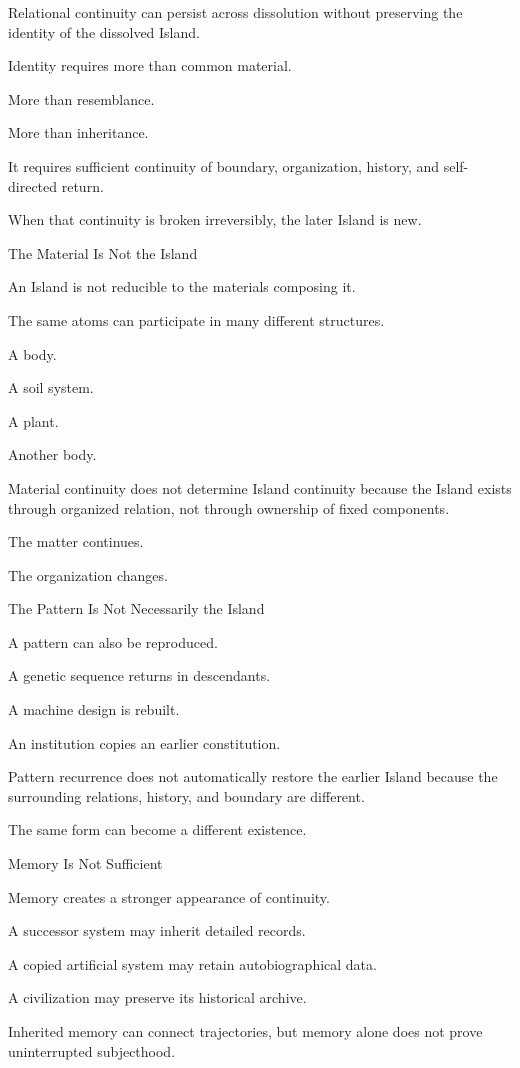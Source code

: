 Relational continuity can persist across dissolution without preserving the identity of the dissolved Island.

Identity requires more than common material.

More than resemblance.

More than inheritance.

It requires sufficient continuity of boundary, organization, history, and self-directed return.

When that continuity is broken irreversibly, the later Island is new.

The Material Is Not the Island

An Island is not reducible to the materials composing it.

The same atoms can participate in many different structures.

A body.

A soil system.

A plant.

Another body.

Material continuity does not determine Island continuity because the Island exists through organized relation, not through ownership of fixed components.

The matter continues.

The organization changes.

The Pattern Is Not Necessarily the Island

A pattern can also be reproduced.

A genetic sequence returns in descendants.

A machine design is rebuilt.

An institution copies an earlier constitution.

Pattern recurrence does not automatically restore the earlier Island because the surrounding relations, history, and boundary are different.

The same form can become a different existence.

Memory Is Not Sufficient

Memory creates a stronger appearance of continuity.

A successor system may inherit detailed records.

A copied artificial system may retain autobiographical data.

A civilization may preserve its historical archive.

Inherited memory can connect trajectories, but memory alone does not prove uninterrupted subjecthood.


